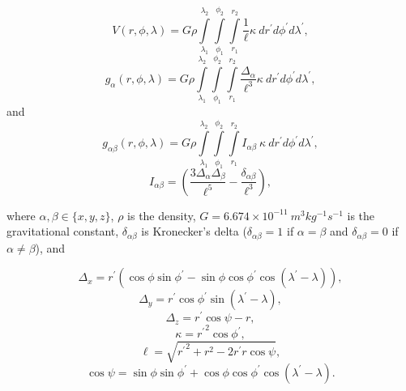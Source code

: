 \begin{equation}
    V(r,\phi,\lambda) = G \rho
        \int\limits_{\lambda_1}^{\lambda_2}
        \int\limits_{\phi_1}^{\phi_2}
        \int\limits_{r_1}^{r_2}
        \frac{1}{\ell}
        \kappa\  dr^\prime d\phi^\prime d\lambda^\prime,
    \label{eq:p2-tesspot}
\end{equation}
\begin{equation}
    g_{\alpha}(r,\phi,\lambda) = G \rho
        \int\limits_{\lambda_1}^{\lambda_2}
        \int\limits_{\phi_1}^{\phi_2}
        \int\limits_{r_1}^{r_2}
        \frac{\Delta_\alpha}{\ell^3}
        \kappa\ dr^\prime d\phi^\prime d\lambda^\prime,
    \label{eq:p2-tessgrav}
\end{equation}
\noindent
and
\begin{equation}
    g_{\alpha\beta}(r,\phi,\lambda) = G \rho
        \int\limits_{\lambda_1}^{\lambda_2}
        \int\limits_{\phi_1}^{\phi_2}
        \int\limits_{r_1}^{r_2}
        I_{\alpha\beta}
        \ \kappa\ dr^\prime d\phi^\prime d\lambda^\prime ,
    \label{eq:p2-tesstensor}
\end{equation}
\begin{equation}
    I_{\alpha\beta} =
    \left(
        \frac{3\Delta_{\alpha} \Delta_{\beta}}{\ell^5} -
        \frac{\delta_{\alpha\beta}}{\ell^3}
    \right) ,
    \label{eq:p2-tesstensorkernel}
\end{equation}

\noindent
where $\alpha, \beta \in \{x, y, z\}$,
$\rho$ is the density,
$G = 6.674\times10^{-11}\ m^3kg^{-1}s^{-1}$ is the gravitational constant,
$\delta_{\alpha\beta}$ is Kronecker's delta
($\delta_{\alpha\beta} = 1$ if $\alpha = \beta$
and $\delta_{\alpha\beta} = 0$ if $\alpha \neq \beta$),
and

\begin{equation}
    \Delta_x = r^\prime(\cos\phi\sin\phi^\prime - \sin\phi\cos\phi^\prime
               \cos(\lambda^\prime - \lambda)),
\end{equation}
\begin{equation}
    \Delta_y = r^\prime \cos \phi^\prime \sin(\lambda^\prime - \lambda),
\end{equation}
\begin{equation}
    \Delta_z = r^\prime \cos \psi - r,
\end{equation}
\begin{equation}
    \kappa = {r^\prime}^2 \cos \phi^\prime,
\end{equation}
\begin{equation}
    \ell = \sqrt{{r^\prime}^2 + r^2 - 2 r^\prime r \cos \psi},
\end{equation}
\begin{equation}
    \cos\psi = \sin\phi\sin\phi^\prime + \cos\phi\cos\phi^\prime
                 \cos(\lambda^\prime - \lambda).
\end{equation}

